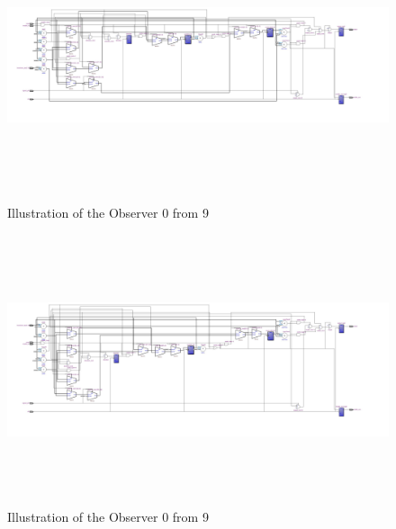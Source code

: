 \begin{figure}[]
\centering
\includegraphics[width=650px,height=300px,angle=-90]{../../pictures/13.06.2014/plain_generator/200Mhz/10OBS/observer_OBS_0.jpg}
\caption[Observer 0 of the Final Version]{Illustration of the Observer 0 from 9 }
\label{fig:version:final:obs:0}
\end{figure}


\begin{figure}[]
\centering
\includegraphics[width=650px,height=300px,angle=-90]{../../pictures/13.06.2014/plain_generator/200Mhz/10OBS/observer_OBS_5.jpg}
\caption[Observer 5  of the Final Version]{Illustration of the Observer 0 from 9 }
\label{fig:version:final:obs:5}
\end{figure}


